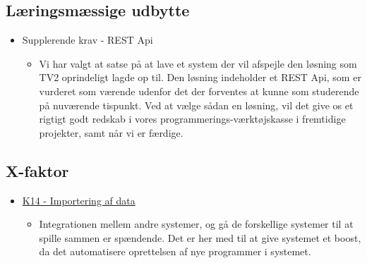 
\subsection{Læringsmæssige udbytte}
\begin{itemize}
    \item Supplerende krav - REST Api
    \begin{itemize}
        \item Vi har valgt at satse på at lave et system der vil afspejle den løsning som TV2 oprindeligt lagde op til. Den løsning indeholder et REST Api, som er vurderet som værende udenfor det der forventes at kunne som studerende på nuværende tispunkt. Ved at vælge sådan en løsning, vil det give os et rigtigt godt redskab i vores programmerings-værktøjskasse i fremtidige projekter, samt når vi er færdige.
    \end{itemize}{}
\end{itemize}


\subsection{X-faktor}
\begin{itemize}
    \item \hyperref[table:funktionskrav]{K14 - Importering af data} 
    \begin{itemize}
        \item Integrationen mellem andre systemer, og gå de forskellige systemer til at spille sammen er spændende. Det er her med til at give systemet et boost, da det automatisere oprettelsen af nye programmer i systemet.
    \end{itemize}{}
\end{itemize}
